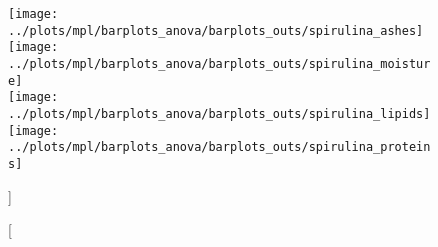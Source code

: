 
\begin{figure}[H]
\centering
		{\texttt{[image: ../plots/mpl/barplots\_anova/barplots\_outs/spirulina\_ashes]}}%
\hfill
		{\texttt{[image: ../plots/mpl/barplots\_anova/barplots\_outs/spirulina\_moisture]}}%
\\[\vbtwsfig]
		{\texttt{[image: ../plots/mpl/barplots\_anova/barplots\_outs/spirulina\_lipids]}}%
\hfill
		{\texttt{[image: ../plots/mpl/barplots\_anova/barplots\_outs/spirulina\_proteins]}}%
\caption%
[]%
{\brpltfigtitle{} }
\label{fig:}
\end{figure}
